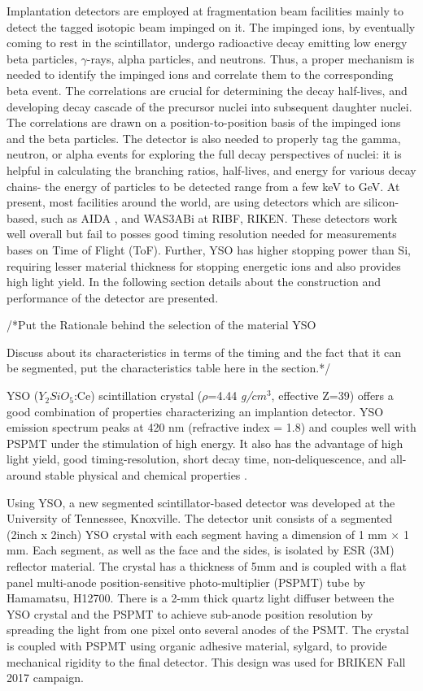\documentclass[a4paper,12pt,twoside]{report}
\begin{document}
Implantation detectors are employed at fragmentation beam facilities mainly to detect the tagged isotopic beam impinged on it. The impinged ions, by eventually coming to rest in the scintillator, undergo radioactive decay emitting low energy beta particles, $\gamma$-rays, alpha particles, and neutrons. Thus, a proper mechanism is needed to identify the impinged ions and correlate them to the corresponding beta event. The correlations are crucial for determining the decay half-lives, and developing decay cascade of the precursor nuclei into subsequent daughter nuclei. The correlations are drawn on a position-to-position basis of the impinged ions and the beta particles. The detector is also needed to properly tag the gamma, neutron, or alpha events for exploring the full decay perspectives of nuclei: it is helpful in calculating the branching ratios, half-lives, and energy for various decay chains- the energy of particles to be detected range from a few keV to GeV. At present, most facilities around the world, are using detectors which are silicon-based, such as AIDA \cite{AIDA}, and WAS3ABi \cite{wasabi} at RIBF, RIKEN. These detectors work well overall but fail to posses good timing resolution needed for measurements bases on Time of Flight (ToF). Further, YSO has higher stopping power than Si, requiring lesser material thickness for stopping energetic ions and also provides high light yield.
In the following section details about the construction and performance of the detector are presented.




/*Put the Rationale behind the selection of the material YSO

Discuss about its characteristics in terms of the timing and the fact that it can be segmented,
put the characteristics table here in the section.*/


YSO ($Y_{2}SiO_{5}$:Ce) scintillation crystal ($\rho$=4.44 \textit{g/$cm^{3}$}, effective Z=39) offers a good combination of properties characterizing an implantion detector. YSO emission spectrum peaks at 420 nm (refractive index = 1.8) and couples well with PSPMT under the stimulation of high energy. It also has the advantage of high light yield, good timing-resolution, short decay time, non-deliquescence, and all-around stable physical and chemical properties \cite{ysospecs}.

Using YSO, a new segmented scintillator-based detector was developed at the University of Tennessee, Knoxville. The detector unit consists of a segmented (2inch x 2inch) YSO crystal with each segment having a dimension of 1 mm $\times$ 1 mm. Each segment, as well as the face and the sides, is isolated by ESR (3M) reflector material. The crystal has a thickness of 5mm and is coupled with a flat panel multi-anode position-sensitive photo-multiplier (PSPMT) tube by Hamamatsu, H12700. There is a 2-mm thick quartz light diffuser between the YSO crystal and the PSPMT to achieve sub-anode position resolution by spreading the light from one pixel onto several anodes of the PSMT. The crystal is coupled with PSPMT using organic adhesive material, sylgard, to provide mechanical rigidity to the final detector. This design was used for BRIKEN Fall 2017 campaign.
\end{document}
